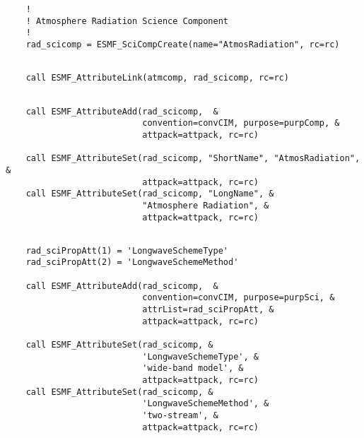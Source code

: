 
 \begin{verbatim}
    !
    ! Atmosphere Radiation Science Component
    !
    rad_scicomp = ESMF_SciCompCreate(name="AtmosRadiation", rc=rc)
 
\end{verbatim}
 

 \begin{verbatim}
    call ESMF_AttributeLink(atmcomp, rad_scicomp, rc=rc)
 
\end{verbatim}
 

 \begin{verbatim}
    call ESMF_AttributeAdd(rad_scicomp,  &
                           convention=convCIM, purpose=purpComp, &
                           attpack=attpack, rc=rc)

    call ESMF_AttributeSet(rad_scicomp, "ShortName", "AtmosRadiation", &
                           attpack=attpack, rc=rc)
    call ESMF_AttributeSet(rad_scicomp, "LongName", &
                           "Atmosphere Radiation", &
                           attpack=attpack, rc=rc)
 
\end{verbatim}
 

 \begin{verbatim}
    rad_sciPropAtt(1) = 'LongwaveSchemeType'
    rad_sciPropAtt(2) = 'LongwaveSchemeMethod'

    call ESMF_AttributeAdd(rad_scicomp,  &
                           convention=convCIM, purpose=purpSci, &
                           attrList=rad_sciPropAtt, &
                           attpack=attpack, rc=rc)

    call ESMF_AttributeSet(rad_scicomp, &
                           'LongwaveSchemeType', &
                           'wide-band model', &
                           attpack=attpack, rc=rc)
    call ESMF_AttributeSet(rad_scicomp, &
                           'LongwaveSchemeMethod', &
                           'two-stream', &
                           attpack=attpack, rc=rc)
 
\end{verbatim}
 
